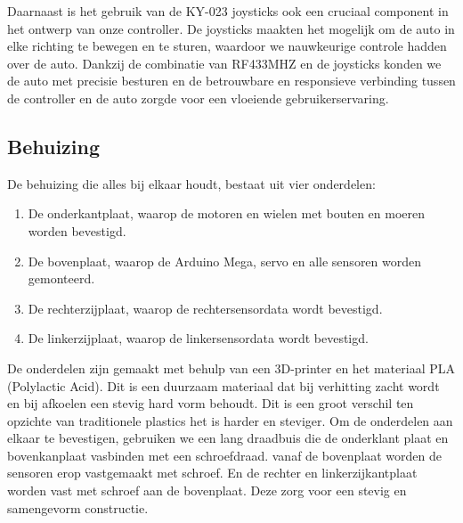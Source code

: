 Daarnaast is het gebruik van de KY-023\cite{KY023} joysticks ook een cruciaal component in het ontwerp van onze controller. De joysticks maakten het mogelijk om de auto in elke richting te bewegen en te sturen, waardoor we nauwkeurige controle hadden over de auto. Dankzij de combinatie van \gls{RF433MHZ} en de joysticks konden we de auto met precisie besturen en de betrouwbare en responsieve verbinding tussen de controller en de auto zorgde voor een vloeiende gebruikerservaring.

\subsection{Behuizing}
De behuizing die alles bij elkaar houdt, bestaat uit vier onderdelen:
\begin{enumerate}
\item De onderkantplaat, waarop de motoren en wielen met bouten en moeren worden bevestigd.\item De bovenplaat, waarop de Arduino Mega, servo en alle sensoren worden gemonteerd.
\item De rechterzijplaat, waarop de rechtersensordata wordt bevestigd.
\item De linkerzijplaat, waarop de linkersensordata wordt bevestigd.
\end{enumerate}
De onderdelen zijn gemaakt met behulp van een 3D-printer en het materiaal PLA (Polylactic Acid). Dit is een duurzaam materiaal dat bij verhitting zacht wordt en bij afkoelen een stevig hard vorm behoudt. Dit is een groot verschil ten opzichte van traditionele plastics het is harder en steviger. Om de onderdelen aan elkaar te bevestigen, gebruiken we een lang draadbuis die de onderklant plaat en bovenkanplaat vasbinden met een schroefdraad. vanaf de bovenplaat worden de sensoren erop vastgemaakt met schroef. En de rechter en linkerzijkantplaat worden vast met schroef aan de bovenplaat. Deze zorg voor een stevig en samengevorm constructie.
